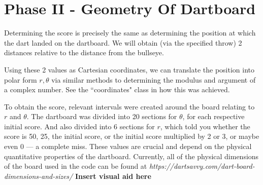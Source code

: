 \documentclass[a4paper]{article}
\begin{document}
\section{Phase II - Geometry Of Dartboard}
Determining the score is precisely the same as determining the position at which the dart landed
on the dartboard. We will obtain (via the specified throw) 2 distances relative to the distance from the
bullseye.

Using these 2 values as Cartesian coordinates, we can translate the position into polar form $r, \theta $ via similar methods to determining the modulus and argument of a complex number. See the ``coordinates" class in how this was achieved. 

To obtain the score, relevant intervals were created around the board relating to $r$ and $\theta$. The dartboard was divided into 20 sections for $\theta$, for each respective initial score. And also divided into 6 sections for $r$, which told you whether the score is 50, 25, the initial score, or the initial score multiplied by 2 or 3, or maybe even 0 — a complete miss. These values are crucial and depend on the physical quantitative properties of the dartboard. Currently, all of the physical dimensions of the board used in the code can be found at \textit{https://dartsavvy.com/dart-board-dimensions-and-sizes/} \cite{Dartsavvy} 
\vspace{7px}
\textbf{Insert visual aid here}




\end{document}
